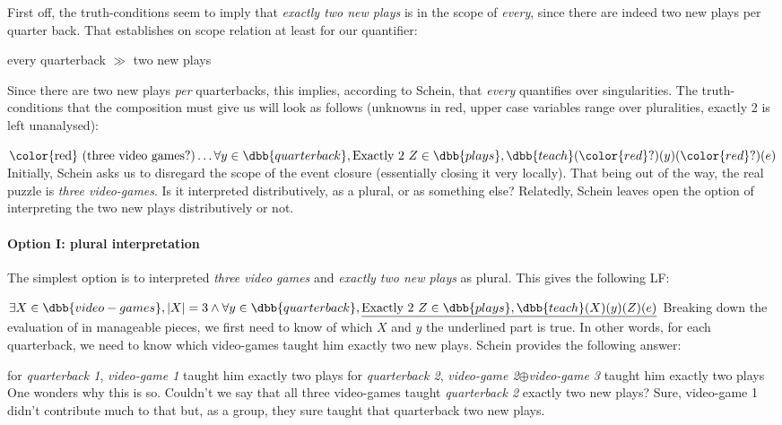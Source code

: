 \documentclass[english]{article}
\begin{document}
First off, the truth-conditions seem to imply that \emph{exactly two new plays} is in the scope of \emph{every}, since there are indeed two new plays per quarter back. That establishes on scope relation at least for our quantifier:

\begin{center}
every quarterback $\gg$ two new plays
\end{center}
%
Since there are two new plays \emph{per} quarterbacks, this implies, according to Schein, that \emph{every} quantifies over singularities. The truth-conditions that the composition must give us will look as follows (unknowns in red, upper case variables range over pluralities, exactly 2 is left unanalysed):

\ex
$\text{\color{red} (three video games?)} \ldots \forall y\in \dbb{quarterback}, \text{Exactly 2 } Z\in \dbb{plays},  \dbb{teach}({\color{red} ?})(y)({\color{red} ?})(e)$
\xe
%
Initially, Schein asks us to disregard the scope of the event closure (essentially closing it very locally). That being out of the way,
the real puzzle is \emph{three video-games}. Is it interpreted distributively, as a plural, or as something else? Relatedly, Schein leaves open the option of interpreting the two new plays distributively or not.

\paragraph{Option I: plural interpretation} The simplest option is to interpreted \emph{three video games} and \emph{exactly two new plays} as plural. This gives the following LF:

\ex\label{lf1}
$\exists X\in \dbb{video-games}, |X| = 3 \wedge \forall y\in \dbb{quarterback}, \underline{\text{Exactly 2 } Z\in \dbb{plays},  \dbb{teach}(X)(y)(Z)(e)}$
\xe
%
Breaking down the evaluation of \clastx in manageable pieces, we first need to know of which $X$ and $y$ the underlined part is true. In other words, for each quarterback, we need to know which video-games taught him exactly two new plays. Schein provides the following answer:

\pex
\a for \emph{quarterback 1}, \emph{video-game 1} taught him exactly two plays
\a for \emph{quarterback 2}, \emph{video-game 2}$\oplus$\emph{video-game 3} taught him exactly two plays
\xe
%
One wonders why this is so. Couldn't we say that all three video-games taught \emph{quarterback 2} exactly two new plays? Sure, video-game 1 didn't contribute much to that but, as a group, they sure taught that quarterback two new plays.
\end{document}
